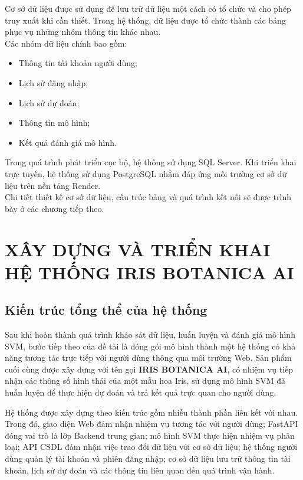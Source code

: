 \documentclass[14pt]{extarticle}
\begin{document}
							\noindent Cơ sở dữ liệu được sử dụng để lưu trữ dữ liệu một cách có tổ chức và cho phép truy xuất khi cần thiết. Trong hệ thống, dữ liệu được tổ chức thành các bảng phục vụ những nhóm thông tin khác nhau.\\
						
						\noindent	Các nhóm dữ liệu chính bao gồm:
						
						\begin{itemize}
							\item Thông tin tài khoản người dùng;
							\item Lịch sử đăng nhập;
							\item Lịch sử dự đoán;
							\item Thông tin mô hình;
							\item Kết quả đánh giá mô hình.
						\end{itemize}
						
						\noindent	Trong quá trình phát triển cục bộ, hệ thống sử dụng SQL Server. Khi triển khai trực tuyến, hệ thống sử dụng PostgreSQL nhằm đáp ứng môi trường cơ sở dữ liệu trên nền tảng Render.\\
						
							\noindent Chi tiết thiết kế cơ sở dữ liệu, cấu trúc  bảng và quá trình kết nối sẽ được trình bày ở các chương tiếp theo.
							
		\newpage 
		
	\section{XÂY DỰNG VÀ TRIỂN KHAI HỆ THỐNG IRIS BOTANICA AI}
	
	\subsection{Kiến trúc tổng thể của hệ thống}
	
	\noindent Sau khi hoàn thành quá trình khảo sát dữ liệu, huấn luyện và đánh giá mô hình SVM, bước tiếp theo của đề tài là đóng gói mô hình thành một hệ thống có khả năng tương tác trực tiếp với người dùng thông qua môi trường Web. Sản phẩm cuối cùng được xây dựng với tên gọi \textbf{IRIS BOTANICA AI}, có nhiệm vụ tiếp nhận các thông số hình thái của một mẫu hoa Iris, sử dụng mô hình SVM đã huấn luyện để thực hiện dự đoán và trả kết quả trực quan cho người dùng.
	
	\noindent Hệ thống được xây dựng theo kiến trúc gồm nhiều thành phần liên kết với nhau. Trong đó, giao diện Web đảm nhận nhiệm vụ tương tác với người dùng; FastAPI đóng vai trò là lớp Backend trung gian; mô hình SVM thực hiện nhiệm vụ phân loại; API CSDL đảm nhận việc trao đổi dữ liệu với cơ sở dữ liệu; hệ thống người dùng quản lý tài khoản và phiên đăng nhập; cơ sở dữ liệu lưu trữ thông tin tài khoản, lịch sử dự đoán và các thông tin liên quan đến quá trình vận hành.
	
\end{document}

